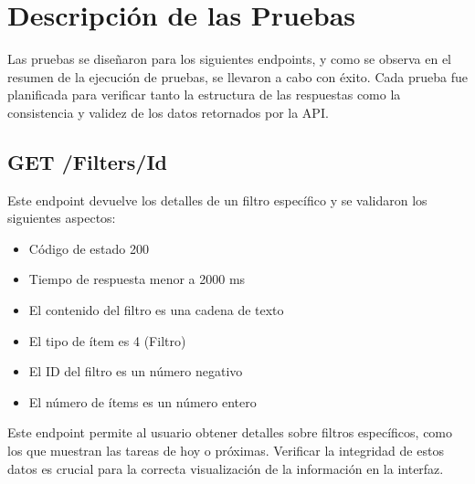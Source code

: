 \documentclass{report}
\begin{document}
\clearpage

\section{Descripción de las Pruebas}
Las pruebas se diseñaron para los siguientes endpoints, y como se observa en el resumen de la ejecución de pruebas, se llevaron a cabo con éxito. Cada prueba fue planificada para verificar tanto la estructura de las respuestas como la consistencia y validez de los datos retornados por la API.

\subsection{GET /Filters/Id}
Este endpoint devuelve los detalles de un filtro específico y se validaron los siguientes aspectos:
\begin{itemize}
    \item Código de estado 200 \checkmark
    \item Tiempo de respuesta menor a 2000 ms \checkmark
    \item El contenido del filtro es una cadena de texto \checkmark
    \item El tipo de ítem es 4 (Filtro) \checkmark
    \item El ID del filtro es un número negativo \checkmark
    \item El número de ítems es un número entero \checkmark
\end{itemize}

Este endpoint permite al usuario obtener detalles sobre filtros específicos, como los que muestran las tareas de hoy o próximas. Verificar la integridad de estos datos es crucial para la correcta visualización de la información en la interfaz.
\end{document}
